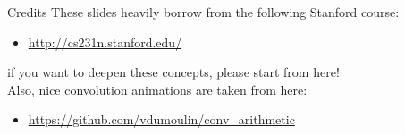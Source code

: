 \begin{frame}{Credits}
These slides heavily borrow from the following Stanford course:
\begin{itemize}
\item \url{http://cs231n.stanford.edu/}
\end{itemize}
if you want to deepen these concepts, please start from here!\\
\vspace{0.2cm}
Also, nice convolution animations are taken from here:
\begin{itemize}
\item \url{https://github.com/vdumoulin/conv_arithmetic}
\end{itemize}
\end{frame}